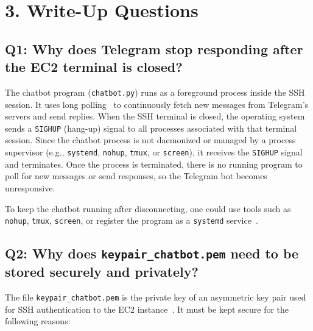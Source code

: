 \documentclass[11pt]{article}
\begin{document}
\section*{3. Write-Up Questions}

\subsection*{Q1: Why does Telegram stop responding after the EC2 terminal is closed?}

The chatbot program (\texttt{chatbot.py}) runs as a foreground process inside the SSH session.
It uses long polling~\cite{telegram-bot-api} to continuously fetch new messages from Telegram's servers and send replies.
When the SSH terminal is closed, the operating system sends a \texttt{SIGHUP} (hang-up) signal to all processes associated with that terminal session.
Since the chatbot process is not daemonized or managed by a process supervisor (e.g., \texttt{systemd}, \texttt{nohup}, \texttt{tmux}, or \texttt{screen}), it receives the \texttt{SIGHUP} signal and terminates.
Once the process is terminated, there is no running program to poll for new messages or send responses, so the Telegram bot becomes unresponsive.

To keep the chatbot running after disconnecting, one could use tools such as \texttt{nohup}, \texttt{tmux}, \texttt{screen}, or register the program as a \texttt{systemd} service~\cite{aws-ec2-docs}.

\subsection*{Q2: Why does \texttt{keypair\_chatbot.pem} need to be stored securely and privately?}

The file \texttt{keypair\_chatbot.pem} is the private key of an asymmetric key pair used for SSH authentication to the EC2 instance~\cite{aws-ec2-docs}.
It must be kept secure for the following reasons:
\end{document}
